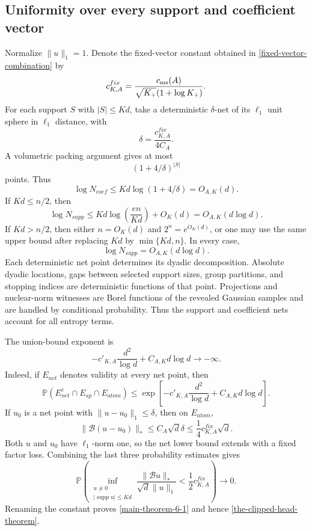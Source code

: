 \documentclass[11pt]{article}
\numberwithin{equation}{section}
\theoremstyle{definition}
\theoremstyle{remark}
\newcommand{\Pp}{\mathbb P}
\newcommand{\1}{\boldsymbol 1}
\begin{document}
\begin{aiblock}
\subsection{Uniformity over every support and
  coefficient vector}\label{whole-class-deterministic-union}

Normalize $\|u\|_1=1$. Denote the fixed-vector constant
obtained in \cref{fixed-vector-combination} by
\[
  c^{fix}_{K,A}=\frac{c_{\rm ms}(A)}
  {\sqrt{K_+}(1+\log K_+)}.
\]
For each support $S$ with $|S|\le Kd$, take a
deterministic $\delta$-net of its $\ell_1$ unit sphere
in $\ell_1$ distance, with
\[
  \delta=\frac{c^{fix}_{K,A}}{4C_A}.
\]
A volumetric packing argument gives at most
\[
  (1+4/\delta)^{|S|}
\]
points. Thus
\[
  \log N_{coef}\le Kd\log(1+4/\delta)=O_{A,K}(d).
\]
If $Kd\le n/2$, then
\[
  \log N_{supp} \le Kd\log\left(\frac{en}{Kd}\right)
  +O_K(d)=O_{A,K}(d\log d).
\]
If $Kd>n/2$, then either $n=O_K(d)$ and
$2^n=e^{O_K(d)}$, or one may use the same upper bound
after replacing $Kd$ by $\min\{Kd,n\}$. In every case,
\[
  \log N_{supp}=O_{A,K}(d\log d).
\]
Each deterministic net point determines its dyadic
decomposition. Absolute dyadic locations, gaps between
selected support sizes, group partitions, and stopping
indices are deterministic functions of that point.
Projections and nuclear-norm witnesses are Borel
functions of the revealed Gaussian samples and are
handled by conditional probability. Thus the support and
coefficient nets account for all entropy terms.

The union-bound exponent is
\[
  -c'_{K,A}\frac{d^2}{\log d}+C_{A,K}d\log d
  \longrightarrow-\infty.
\]
Indeed, if $E_{net}$ denotes validity at every net
point, then
\[
  \Pp(E_{net}^c\cap E_{sp}\cap E_{atom}) \le
  \exp\left[-c'_{K,A}\frac{d^2}{\log d}+C_{A,K}d\log
  d\right].
\]
If $u_0$ is a net point with $\|u-u_0\|_1\le\delta$,
then on $E_{atom}$,
\[
  \|\mathcal{B}(u-u_0)\|_* \le C_A\sqrt d\delta \le
  \frac14c^{fix}_{K,A}\sqrt d.
\]
Both $u$ and $u_0$ have $\ell_1$-norm one, so the net
lower bound extends with a fixed factor loss. Combining
the last three probability estimates gives
\[
  \Pp\left(\inf_{\substack{u\ne0\\
  |\operatorname{supp}u|\le Kd}}\frac{\|\mathcal{B}u\|_*}
  {\sqrt d\|u\|_1}<\frac12c^{fix}_{K,A}\right)\to0.
\]
Renaming the constant proves \cref{main-theorem-6-1}
and hence \cref{the-clipped-head-theorem}.
   
\end{aiblock}
\end{document}

